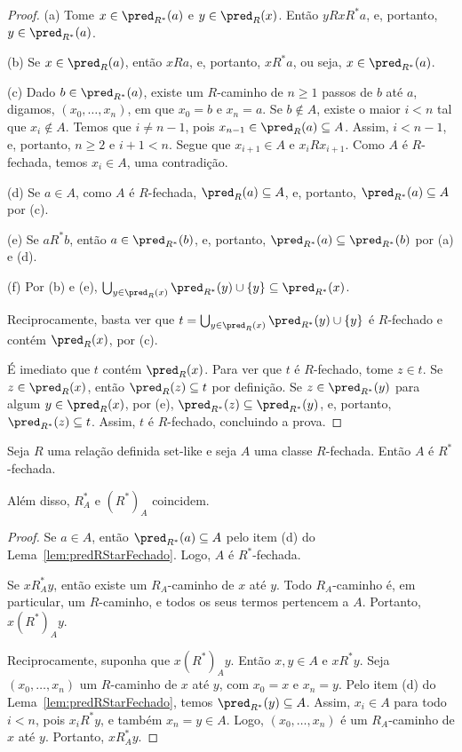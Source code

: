 \begin{proof}
    (a) Tome $x\in \pred_{R^*}(a)$ e $y\in \pred_R(x)$.
    Então $y R x R^* a$, e, portanto, $y\in \pred_{R^*}(a)$.

    (b) Se $x\in \pred_R(a)$, então $x R a$, e, portanto, $x R^* a$, ou seja, $x\in \pred_{R^*}(a)$.

    (c) Dado $b\in \pred_{R^*}(a)$, existe um $R$-caminho de $n\geq 1$ passos de $b$ até $a$, digamos, $(x_0, \dots, x_{n})$, em que $x_0=b$ e $x_{n}=a$.
    Se $b \notin A$, existe o maior $i<n$ tal que $x_i \notin A$.
    Temos que $i\neq n-1$, pois $x_{n-1}\in \pred_R(a)\subseteq A$.
    Assim, $i<n-1$, e, portanto, $n\geq 2$ e $i+1<n$.
    Segue que $x_{i+1}\in A$ e $x_i R x_{i+1}$.
    Como $A$ é $R$-fechada, temos $x_i\in A$, uma contradição.

    (d) Se $a\in A$, como $A$ é $R$-fechada, $\pred_R(a)\subseteq A$, e, portanto, $\pred_{R^*}(a)\subseteq A$ por (c).

    (e) Se $a R^* b$, então $a\in \pred_{R^*}(b)$, e, portanto, $\pred_{R^*}(a)\subseteq \pred_{R^*}(b)$ por (a) e (d).

    (f) Por (b) e (e), $\bigcup_{y \in \pred_R(x)}\pred_{R^*}(y)\cup\{y\}\subseteq \pred_{R^*}(x)$.

    Reciprocamente, basta ver que $t=\bigcup_{y \in \pred_R(x)}\pred_{R^*}(y)\cup\{y\}$ é $R$-fechado e contém $\pred_R(x)$, por (c).

    É imediato que $t$ contém $\pred_R(x)$.
    Para ver que $t$ é $R$-fechado, tome $z\in t$.
    Se $z\in \pred_R(x)$, então $\pred_R(z)\subseteq t$ por definição.
    Se $z\in \pred_{R^*}(y)$ para algum $y\in \pred_R(x)$, por (e), $\pred_{R^*}(z)\subseteq \pred_{R^*}(y)$, e, portanto, $\pred_{R^*}(z)\subseteq t$.
    Assim, $t$ é $R$-fechado, concluindo a prova.
\end{proof}

\begin{corollary}[$\ZFmP$]\label{cor:RFechadaRStar}
    Seja $R$ uma relação definida set-like e seja $A$ uma classe $R$-fechada.
    Então $A$ é $R^*$-fechada.

    Além disso, $R_A^*$ e $(R^*)_A$ coincidem.
\end{corollary}
\begin{proof}
    Se $a\in A$, então $\pred_{R^*}(a)\subseteq A$ pelo item (d) do Lema~\ref{lem:predRStarFechado}.
    Logo, $A$ é $R^*$-fechada.

    Se $x R_A^* y$, então existe um $R_A$-caminho de $x$ até $y$.
    Todo $R_A$-caminho é, em particular, um $R$-caminho, e todos os seus termos pertencem a $A$.
    Portanto, $x (R^*)_A y$.

    Reciprocamente, suponha que $x (R^*)_A y$.
    Então $x,y\in A$ e $xR^*y$.
    Seja $(x_0,\dots,x_n)$ um $R$-caminho de $x$ até $y$, com $x_0=x$ e $x_n=y$.
    Pelo item (d) do Lema~\ref{lem:predRStarFechado}, temos $\pred_{R^*}(y)\subseteq A$.
    Assim, $x_i\in A$ para todo $i<n$, pois $x_i R^* y$, e também $x_n=y\in A$.
    Logo, $(x_0,\dots,x_n)$ é um $R_A$-caminho de $x$ até $y$.
    Portanto, $x R_A^* y$.
\end{proof}


